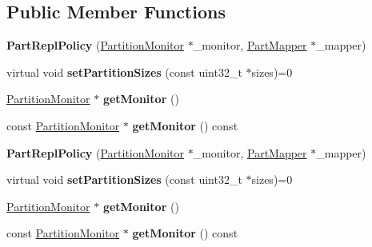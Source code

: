 \subsection*{Public Member Functions}
\begin{DoxyCompactItemize}
\item 
\hypertarget{classPartReplPolicy_a29b297f5d795c312e054990c57a517ae}{{\bfseries Part\-Repl\-Policy} (\hyperlink{classPartitionMonitor}{Partition\-Monitor} $\ast$\-\_\-monitor, \hyperlink{classPartMapper}{Part\-Mapper} $\ast$\-\_\-mapper)}\label{classPartReplPolicy_a29b297f5d795c312e054990c57a517ae}

\item 
\hypertarget{classPartReplPolicy_a7b69f8f5aa34b66c6ab3ee11a99996e2}{virtual void {\bfseries set\-Partition\-Sizes} (const uint32\-\_\-t $\ast$sizes)=0}\label{classPartReplPolicy_a7b69f8f5aa34b66c6ab3ee11a99996e2}

\item 
\hypertarget{classPartReplPolicy_a95734ae50d3e9d6a54aef7a5103082db}{\hyperlink{classPartitionMonitor}{Partition\-Monitor} $\ast$ {\bfseries get\-Monitor} ()}\label{classPartReplPolicy_a95734ae50d3e9d6a54aef7a5103082db}

\item 
\hypertarget{classPartReplPolicy_a670febef035e87e5720c2011dcb48058}{const \hyperlink{classPartitionMonitor}{Partition\-Monitor} $\ast$ {\bfseries get\-Monitor} () const }\label{classPartReplPolicy_a670febef035e87e5720c2011dcb48058}

\item 
\hypertarget{classPartReplPolicy_a29b297f5d795c312e054990c57a517ae}{{\bfseries Part\-Repl\-Policy} (\hyperlink{classPartitionMonitor}{Partition\-Monitor} $\ast$\-\_\-monitor, \hyperlink{classPartMapper}{Part\-Mapper} $\ast$\-\_\-mapper)}\label{classPartReplPolicy_a29b297f5d795c312e054990c57a517ae}

\item 
\hypertarget{classPartReplPolicy_a7b69f8f5aa34b66c6ab3ee11a99996e2}{virtual void {\bfseries set\-Partition\-Sizes} (const uint32\-\_\-t $\ast$sizes)=0}\label{classPartReplPolicy_a7b69f8f5aa34b66c6ab3ee11a99996e2}

\item 
\hypertarget{classPartReplPolicy_a95734ae50d3e9d6a54aef7a5103082db}{\hyperlink{classPartitionMonitor}{Partition\-Monitor} $\ast$ {\bfseries get\-Monitor} ()}\label{classPartReplPolicy_a95734ae50d3e9d6a54aef7a5103082db}

\item 
\hypertarget{classPartReplPolicy_a670febef035e87e5720c2011dcb48058}{const \hyperlink{classPartitionMonitor}{Partition\-Monitor} $\ast$ {\bfseries get\-Monitor} () const }\label{classPartReplPolicy_a670febef035e87e5720c2011dcb48058}

\end{DoxyCompactItemize}
